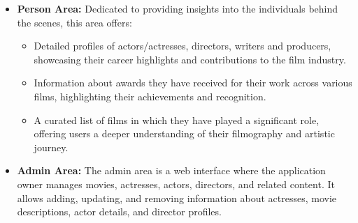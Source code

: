 \begin{itemize}
\item \textbf{Person Area:} Dedicated to providing insights into the individuals behind the scenes, this area offers:
\begin{itemize}
\item Detailed profiles of actors/actresses, directors, writers and producers, showcasing their career highlights and contributions to the film industry.
\item Information about awards they have received for their work across various films, highlighting their achievements and recognition.
\item A curated list of films in which they have played a significant role, offering users a deeper understanding of their filmography and artistic journey.
\end{itemize}
\item \textbf{Admin Area:} 
The admin area is a web interface where the application owner manages movies, actresses, actors, directors, and related content. It allows adding, updating, and removing information about actresses, movie descriptions, actor details, and director profiles.
\end{itemize}